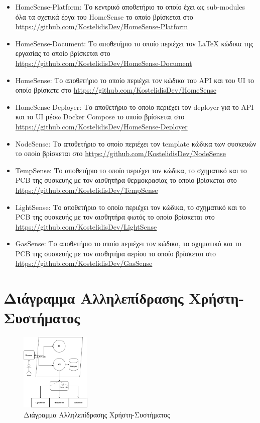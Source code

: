 \documentclass[conference]{IEEEtran}
\begin{document}
\begin{itemize}
	\item HomeSense-Platform: Το κεντρικό αποθετήριο το οποίο έχει ως sub-modules όλα τα σχετικά έργα του HomeSense το οποίο βρίσκεται στο \url{https://github.com/KostelidisDev/HomeSense-Platform}
	\item HomeSense-Document: Το αποθετήριο το οποίο περιέχει τον LaTeX κώδικα της εργασίας το οποίο βρίσκεται στο \url{https://github.com/KostelidisDev/HomeSense-Document}
	\item HomeSense: Το αποθετήριο το οποίο περιέχει τον κώδικα του API και του UI το οποίο βρίσκετε στο \url{https://github.com/KostelidisDev/HomeSense}
	\item HomeSense Deployer: Το αποθετήριο το οποίο περιέχει τον deployer για το API και το UI μέσω Docker Compose το οποίο βρίσκεται στο \url{https://github.com/KostelidisDev/HomeSense-Deployer}
	\item NodeSense: Το αποθετήριο το οποίο περιέχει τον template κώδικα των συσκευών το οποίο βρίσκεται στο \url{https://github.com/KostelidisDev/NodeSense}
	\item TempSense: Το αποθετήριο το οποίο περιέχει τον κώδικα, το σχηματικό και το PCB της συσκευής με τον αισθητήρα θερμοκρασίας το οποίο βρίσκεται στο \url{https://github.com/KostelidisDev/TempSense}
	\item LightSense: Το αποθετήριο το οποίο περιέχει τον κώδικα, το σχηματικό και το PCB της συσκευής με τον αισθητήρα φωτός το οποίο βρίσκεται στο \url{https://github.com/KostelidisDev/LightSense}
	\item GasSense: Το αποθετήριο το οποίο περιέχει τον κώδικα, το σχηματικό και το PCB της συσκευής με τον αισθητήρα αερίου το οποίο βρίσκεται στο \url{https://github.com/KostelidisDev/GasSense}
\end{itemize}

\section{Διάγραμμα Αλληλεπίδρασης Χρήστη-Συστήματος}
\begin{figure}[H]
	\centerline{\includegraphics[width=0.3\textwidth]{assets/diagram}}
	\caption{Διάγραμμα Αλληλεπίδρασης Χρήστη-Συστήματος}
	\label{Διάγραμμα Αλληλεπίδρασης Χρήστη-Συστήματος}
\end{figure}
\end{document}
